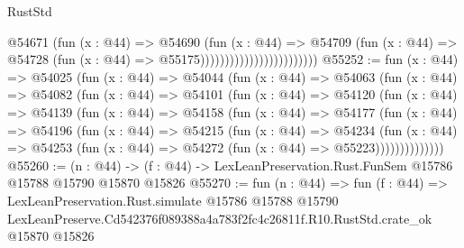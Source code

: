 \begin{lexlean}{RustStd}
\begin{coremodule}
                                          @54671
                                            (fun (x : @44) =>
                                            @54690
                                              (fun (x : @44) =>
                                              @54709
                                                (fun (x : @44) =>
                                                @54728
                                                  (fun (x : @44) => @55175))))))))))))))))))))))))
@55252 := fun (x : @44) =>
  @54025
    (fun (x : @44) =>
    @54044
      (fun (x : @44) =>
      @54063
        (fun (x : @44) =>
        @54082
          (fun (x : @44) =>
          @54101
            (fun (x : @44) =>
            @54120
              (fun (x : @44) =>
              @54139
                (fun (x : @44) =>
                @54158
                  (fun (x : @44) =>
                  @54177
                    (fun (x : @44) =>
                    @54196
                      (fun (x : @44) =>
                      @54215
                        (fun (x : @44) =>
                        @54234
                          (fun (x : @44) =>
                          @54253 (fun (x : @44) => @54272 (fun (x : @44) => @55223))))))))))))))
@55260 := (n : @44) ->
  (f : @44) -> LexLeanPreservation.Rust.FunSem @15786 @15788 @15790 @15870 @15826
@55270 := fun (n : @44) =>
  fun (f : @44) =>
  LexLeanPreservation.Rust.simulate
    @15786
    @15788
    @15790
    LexLeanPreserve.Cd542376f089388a4a783f2fc4c26811f.R10.RustStd.crate_ok
    @15870
    @15826
\end{coremodule}
\end{lexlean}

